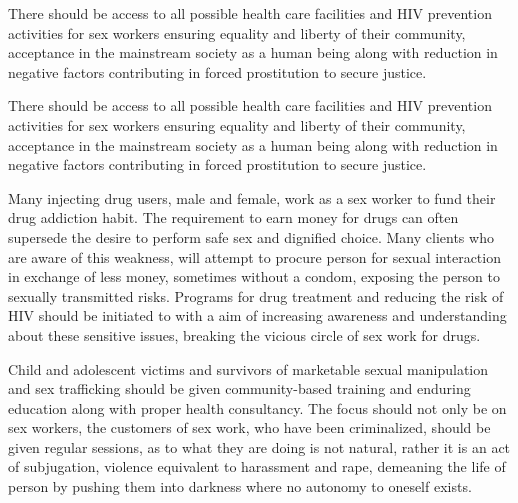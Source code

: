 \begin{multicols}{2}
\noi
There should be access to all possible health care facilities and HIV prevention activities for
sex workers ensuring equality and liberty of their community, acceptance in the mainstream
society as a human being along with reduction in negative factors contributing in forced
prostitution to secure justice.

\noi
There should be access to all possible health care facilities and HIV prevention activities for
sex workers ensuring equality and liberty of their community, acceptance in the mainstream
society as a human being along with reduction in negative factors contributing in forced
prostitution to secure justice.

\noi
Many injecting drug users, male and female, work as a sex worker to fund their drug addiction
habit. The requirement to earn money for drugs can often supersede the desire to perform safe
sex and dignified choice. Many clients who are aware of this weakness, will attempt to procure
person for sexual interaction in exchange of less money, sometimes without a condom,
exposing the person to sexually transmitted risks. Programs for drug treatment and reducing
the risk of HIV should be initiated to with a aim of increasing awareness and understanding
about these sensitive issues, breaking the vicious circle of sex work for drugs.

\noi
Child and adolescent victims and survivors of marketable sexual manipulation and sex
trafficking should be given community-based training and enduring education along with
proper health consultancy. The focus should not only be on sex workers, the customers of sex
work, who have been criminalized, should be given regular sessions, as to what they are doing
is not natural, rather it is an act of subjugation, violence equivalent to harassment and rape,
demeaning the life of person by pushing them into darkness where no autonomy to oneself
exists.
\end{multicols}
	
